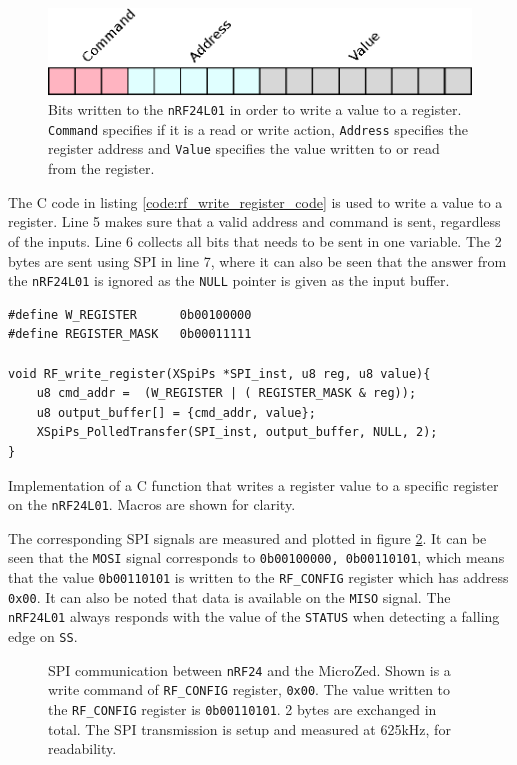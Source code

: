 \begin{figure}[!h]
	\centering
	\includegraphics[width=.3\linewidth]{graphics/rw_register.eps}
	\caption[Writing bits to a register on nRF24L01.]{Bits written to the \texttt{nRF24L01} in order to write a value to a register. \texttt{Command} specifies if it is a read or write action, \texttt{Address} specifies the register address and \texttt{Value} specifies the value written to or read from the register.}
	\label{fig:rw_register}
\end{figure}

The C code in listing \ref{code:rf_write_register_code} is used to write a value to a register. 
Line 5 makes sure that a valid address and command is sent, regardless of the inputs.
Line 6 collects all bits that needs to be sent in one variable. 
The 2 bytes are sent using SPI in line 7, where it can also be seen that the answer from the \texttt{nRF24L01} is ignored as the \texttt{NULL} pointer is given as the input buffer.  

\begin{listing}[!h]
\begin{verbatim}
#define W_REGISTER      0b00100000
#define REGISTER_MASK   0b00011111

void RF_write_register(XSpiPs *SPI_inst, u8 reg, u8 value){
	u8 cmd_addr =  (W_REGISTER | ( REGISTER_MASK & reg));
	u8 output_buffer[] = {cmd_addr, value};
	XSpiPs_PolledTransfer(SPI_inst, output_buffer, NULL, 2);
}
\end{verbatim}
\caption{Implementation of a C function that writes a register value to a specific register on the \texttt{nRF24L01}. Macros are shown for clarity.}
\label{code:rf_write_register_code}
\end{listing}

The corresponding SPI signals are measured and plotted in figure \ref{fig:nrf24_spi}.
It can be seen that the \texttt{MOSI} signal corresponds to \texttt{0b00100000, 0b00110101}, which means that the value \texttt{0b00110101} is written to the \texttt{RF\_CONFIG} register which has address \texttt{0x00}.
It can also be noted that data is available on the \texttt{MISO} signal. 
The \texttt{nRF24L01} always responds with the value of the \texttt{STATUS} when detecting a falling edge on \texttt{SS}.

\begin{figure}[h]
	\centering
	\caption[SPI communication between nRF24 and the MicroZed]{SPI communication between \texttt{nRF24} and the MicroZed. Shown is a write command of \texttt{RF\_CONFIG} register, \texttt{0x00}. The value written to the \texttt{RF\_CONFIG} register is \texttt{0b00110101}. 2 bytes are exchanged in total. The SPI transmission is setup and measured at 625kHz, for readability.}
	\label{fig:nrf24_spi}
\end{figure}


